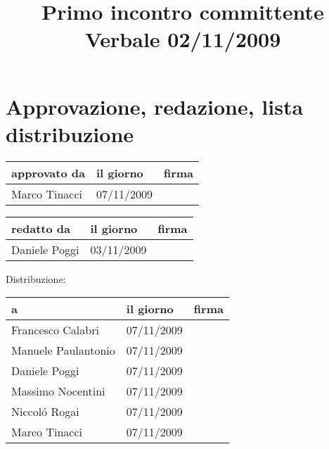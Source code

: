 \documentclass[a4paper, 12pt]{report}
\title{Primo incontro committente \\Verbale 02/11/2009}
\date{02/11/2009 \\Firenze \\\begin{figure}[h] \centering \texttt{[image: ../../../../images/logokiwi.png]} \end{figure} }
\begin{document}
\maketitle

\newpage

\section*{Approvazione, redazione, lista distribuzione}
\begin{table}[h!]
  \begin{center}
    \begin{tabular}{| l | l | p{60mm} |}
    \hline
    \textbf{approvato da} & \textbf{il giorno} & \textbf{firma} \\
	\hline    
	Marco Tinacci & 07/11/2009 &  \\
    \hline
    \end{tabular}
  \end{center}
\end{table}

\begin{table}[h!]
  \begin{center}
    \begin{tabular}{| l | l | p{60mm} |}
    \hline
    \textbf{redatto da} & \textbf{il giorno} & \textbf{firma} \\
	\hline    
	Daniele Poggi & 03/11/2009 &  \\
    \hline
    \end{tabular}
  \end{center}
\end{table}

Distribuzione:
\begin{table}[h!]
  \begin{center}
    \begin{tabular}{| l | l | p{60mm} |}
    \hline
    \textbf{a} & \textbf{il giorno} & \textbf{firma} \\
	\hline    
	Francesco Calabri & 07/11/2009 &  \\
    \hline
	Manuele Paulantonio & 07/11/2009 &  \\
    \hline
	Daniele Poggi & 07/11/2009 &  \\
    \hline
	Massimo Nocentini & 07/11/2009 &  \\
    \hline
	Niccol\'o Rogai & 07/11/2009 &  \\
    \hline
	Marco Tinacci & 07/11/2009 &  \\
    \hline
    \end{tabular}
  \end{center}
\end{table}

\newpage


\end{document}

